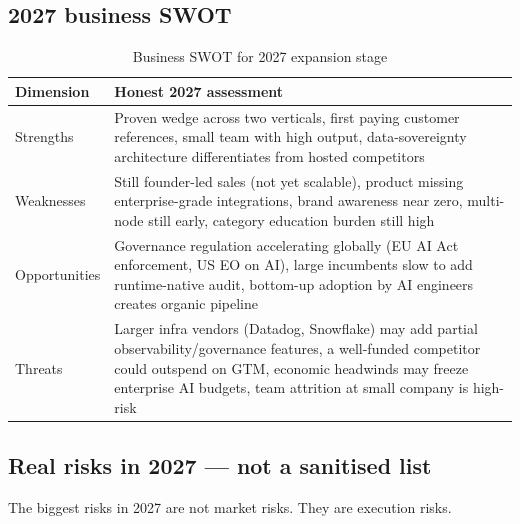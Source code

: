 \subsection{2027 business SWOT}

\begin{table}[H]
\centering
\renewcommand{\arraystretch}{1.45}
\begin{tabularx}{\textwidth}{@{}lX@{}}
\toprule
\textbf{Dimension} & \textbf{Honest 2027 assessment} \\
\midrule
Strengths & Proven wedge across two verticals, first paying customer references, small team with high output, data-sovereignty architecture differentiates from hosted competitors \\
Weaknesses & Still founder-led sales (not yet scalable), product missing enterprise-grade integrations, brand awareness near zero, multi-node still early, category education burden still high \\
Opportunities & Governance regulation accelerating globally (EU AI Act enforcement, US EO on AI), large incumbents slow to add runtime-native audit, bottom-up adoption by AI engineers creates organic pipeline \\
Threats & Larger infra vendors (Datadog, Snowflake) may add partial observability/governance features, a well-funded competitor could outspend on GTM, economic headwinds may freeze enterprise AI budgets, team attrition at small company is high-risk \\
\bottomrule
\end{tabularx}
\caption{Business SWOT for 2027 expansion stage}
\end{table}

\subsection{Real risks in 2027 — not a sanitised list}

The biggest risks in 2027 are not market risks. They are execution risks.

